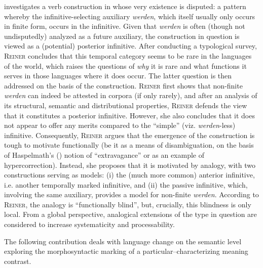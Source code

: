 \documentclass[output=paper,hidelinks]{langscibook}
\begin{document}
\textsc{} investigates a verb construction in  whose very existence is disputed: a pattern whereby the infinitive-selecting auxiliary \textit{werden}, which itself usually only occurs in finite form, occurs in the infinitive. Given that \textit{werden} is often (though not undisputedly) analyzed as a future auxiliary, the construction in question is viewed as a (potential) posterior infinitive. After conducting a typological survey, \textsc{Reiner} concludes that this temporal category seems to be rare in the languages of the world, which raises the questions of \textit{why} it is rare and what functions it serves in those languages where it does occur. The latter question is then addressed on the basis of the  construction. \textsc{Reiner} first shows that non-finite \textit{werden} can indeed be attested in corpora (if only rarely), and after an analysis of its structural, semantic and distributional properties, \textsc{Reiner} defends the view that it constitutes a posterior infinitive. However, she also concludes that it does not appear to offer any merits compared to the ``simple'' (viz. \textit{werden}-less) infinitive. Consequently, \textsc{Reiner} argues that the emergence of the construction is tough to motivate functionally (be it as a means of disambiguation, on the basis of Haspelmath's (\citeyear{Haspelmath1999}) notion of ``extravagance'' or as an example of hypercorrection). Instead, she proposes that it is motivated by analogy, with two constructions serving as models: (i) the (much more common) anterior infinitive, i.e. another temporally marked infinitive, and (ii) the passive infinitive, which, involving the same auxiliary, provides a model for non-finite \textit{werden}. According to \textsc{Reiner}, the analogy is ``functionally blind'', but, crucially, this blindness is only local. From a global perspective, analogical extensions of the type in question are considered to increase systematicity and processability.

The following contribution deals with language change on the semantic level exploring the morphosyntactic marking of a particular–characterizing meaning contrast.
\end{document}

